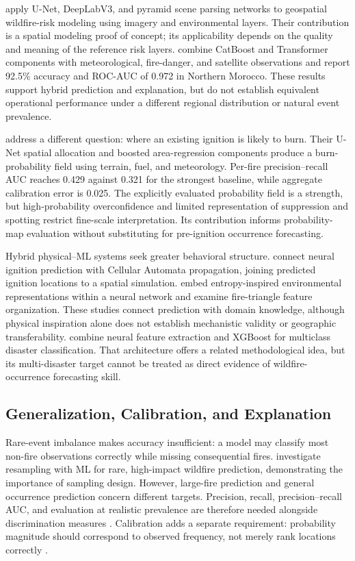 \documentclass[pdflatex,sn-mathphys-num]{sn-jnl}
\begin{document}
\cite{gupta2024geospatial} apply U-Net, DeepLabV3, and pyramid scene parsing networks to geospatial wildfire-risk modeling using imagery and environmental layers. Their contribution is a spatial modeling proof of concept; its applicability depends on the quality and meaning of the reference risk layers. \cite{ouazri2026catboost} combine CatBoost and Transformer components with meteorological, fire-danger, and satellite observations and report 92.5\% accuracy and ROC-AUC of 0.972 in Northern Morocco. These results support hybrid prediction and explanation, but do not establish equivalent operational performance under a different regional distribution or natural event prevalence.

\cite{choi2026burnedarea} address a different question: where an existing ignition is likely to burn. Their U-Net spatial allocation and boosted area-regression components produce a burn-probability field using terrain, fuel, and meteorology. Per-fire precision--recall AUC reaches 0.429 against 0.321 for the strongest baseline, while aggregate calibration error is 0.025. The explicitly evaluated probability field is a strength, but high-probability overconfidence and limited representation of suppression and spotting restrict fine-scale interpretation. Its contribution informs probability-map evaluation without substituting for pre-ignition occurrence forecasting.

Hybrid physical--ML systems seek greater behavioral structure. \cite{benhamza2025hybrid} connect neural ignition prediction with Cellular Automata propagation, joining predicted ignition locations to a spatial simulation. \cite{jadouli2026physics} embed entropy-inspired environmental representations within a neural network and examine fire-triangle feature organization. These studies connect prediction with domain knowledge, although physical inspiration alone does not establish mechanistic validity or geographic transferability. \cite{saleem2025neuralxgb} combine neural feature extraction and XGBoost for multiclass disaster classification. That architecture offers a related methodological idea, but its multi-disaster target cannot be treated as direct evidence of wildfire-occurrence forecasting skill.

\subsection{Generalization, Calibration, and Explanation}

Rare-event imbalance makes accuracy insufficient: a model may classify most non-fire observations correctly while missing consequential fires. \cite{camacho2026resampling} investigate resampling with ML for rare, high-impact wildfire prediction, demonstrating the importance of sampling design. However, large-fire prediction and general occurrence prediction concern different targets. Precision, recall, precision--recall AUC, and evaluation at realistic prevalence are therefore needed alongside discrimination measures \cite{ejaz2025pipeline,mambile2024systematic}. Calibration adds a separate requirement: probability magnitude should correspond to observed frequency, not merely rank locations correctly \cite{choi2026burnedarea}.
\end{document}
